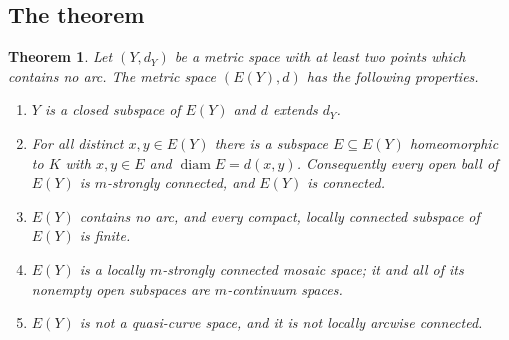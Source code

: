 \documentclass[11pt]{amsart}
\newtheorem{theorem}{Theorem}[section]
\theoremstyle{definition}
\theoremstyle{remark}
\newcommand{\diam}{\operatorname{diam}}
\numberwithin{equation}{section}
\begin{document}
\subsection{The theorem}
\begin{theorem}\label{thm:arcless}
Let $(Y,d_Y)$ be a metric space with at least two points which contains no arc. The metric space $(E(Y),d)$ has the following properties.
\begin{enumerate}[label=\textup{(\arabic*)}]
\item $Y$ is a closed subspace of $E(Y)$ and $d$ extends $d_Y$.
\item For all distinct $x,y\in E(Y)$ there is a subspace $E\subseteq E(Y)$ homeomorphic to $K$ with $x,y\in E$ and $\diam E=d(x,y)$. Consequently every open ball of $E(Y)$ is $m$-strongly connected, and $E(Y)$ is connected.
\item $E(Y)$ contains no arc, and every compact, locally connected subspace of $E(Y)$ is finite.
\item $E(Y)$ is a locally $m$-strongly connected mosaic space; it and all of its nonempty open subspaces are $m$-continuum spaces.
\item $E(Y)$ is not a quasi-curve space, and it is not locally arcwise connected.
\end{enumerate}
\end{theorem}
\end{document}
